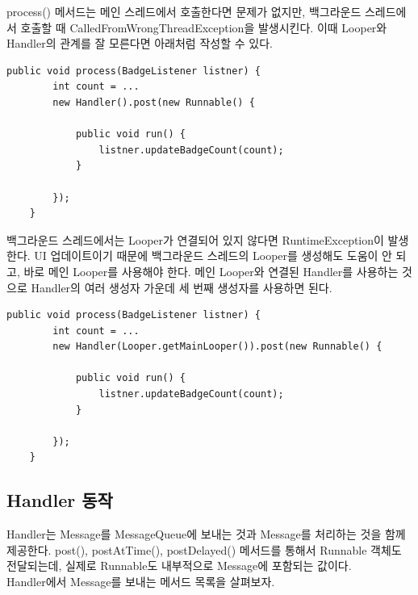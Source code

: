 process() 메서드는 메인 스레드에서 호출한다면 문제가 없지만, 백그라운드 스레드에서 호출할 때 CalledFromWrongThreadException을 발생시킨다. 
이때 Looper와 Handler의 관계를 잘 모른다면 아래처럼 작성할 수 있다.
\begin{lstlisting}[frame=single] 
	public void process(BadgeListener listner) {
		int count = ...
		new Handler().post(new Runnable() {
		
			public void run() {
				listner.updateBadgeCount(count);
			}
			
		});
	}
\end{lstlisting}	
백그라운드 스레드에서는 Looper가 연결되어 있지 않다면 RuntimeException이 발생한다.
UI 업데이트이기 때문에 백그라운드 스레드의 Looper를 생성해도 도움이 안 되고, 바로 메인 Looper를 사용해야 한다. 메인 Looper와 연결된 Handler를 사용하는 것으로 Handler의 여러 생성자 가운데 세 번째 생성자를 사용하면 된다.
\begin{lstlisting}[frame=single] 
	public void process(BadgeListener listner) {
		int count = ...
		new Handler(Looper.getMainLooper()).post(new Runnable() {
		
			public void run() {
				listner.updateBadgeCount(count);
			}
			
		});
	}
\end{lstlisting}

\subsection{Handler 동작}
Handler는 Message를 MessageQueue에 보내는 것과 Message를 처리하는 것을 함께 제공한다. post(), postAtTime(), postDelayed() 메서드를 통해서 Runnable 객체도 전달되는데, 실제로 Runnable도 내부적으로 Message에 포함되는 값이다.\\

Handler에서 Message를 보내는 메서드 목록을 살펴보자.\\

\newline

